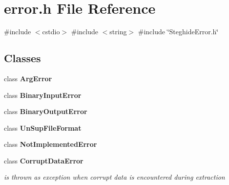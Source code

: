 \section{error.\+h File Reference}
\label{error_8h}
{\ttfamily \#include $<$cstdio$>$}\newline
{\ttfamily \#include $<$string$>$}\newline
{\ttfamily \#include \char`\"{}Steghide\+Error.\+h\char`\"{}}\newline
\subsection*{Classes}
\begin{DoxyCompactItemize}
\item 
class \textbf{ Arg\+Error}
\item 
class \textbf{ Binary\+Input\+Error}
\item 
class \textbf{ Binary\+Output\+Error}
\item 
class \textbf{ Un\+Sup\+File\+Format}
\item 
class \textbf{ Not\+Implemented\+Error}
\item 
class \textbf{ Corrupt\+Data\+Error}
\begin{DoxyCompactList}\small\item\em is thrown as exception when corrupt data is encountered during extraction \end{DoxyCompactList}\end{DoxyCompactItemize}
